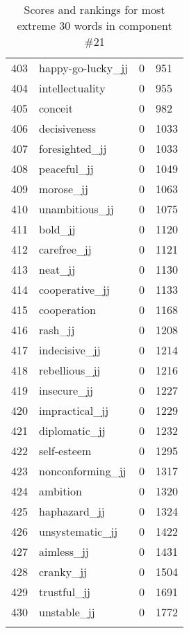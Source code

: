 \begin{longtable}[!htbp]{| rlr@{.}l |}
    403 & happy-go-lucky\_jj & 0 & 951 \\
    404 & intellectuality & 0 & 955 \\
    405 & conceit & 0 & 982 \\
    406 & decisiveness & 0 & 1033 \\
    407 & foresighted\_jj & 0 & 1033 \\
    408 & peaceful\_jj & 0 & 1049 \\
    409 & morose\_jj & 0 & 1063 \\
    410 & unambitious\_jj & 0 & 1075 \\
    411 & bold\_jj & 0 & 1120 \\
    412 & carefree\_jj & 0 & 1121 \\
    413 & neat\_jj & 0 & 1130 \\
    414 & cooperative\_jj & 0 & 1133 \\
    415 & cooperation & 0 & 1168 \\
    416 & rash\_jj & 0 & 1208 \\
    417 & indecisive\_jj & 0 & 1214 \\
    418 & rebellious\_jj & 0 & 1216 \\
    419 & insecure\_jj & 0 & 1227 \\
    420 & impractical\_jj & 0 & 1229 \\
    421 & diplomatic\_jj & 0 & 1232 \\
    422 & self-esteem & 0 & 1295 \\
    423 & nonconforming\_jj & 0 & 1317 \\
    424 & ambition & 0 & 1320 \\
    425 & haphazard\_jj & 0 & 1324 \\
    426 & unsystematic\_jj & 0 & 1422 \\
    427 & aimless\_jj & 0 & 1431 \\
    428 & cranky\_jj & 0 & 1504 \\
    429 & trustful\_jj & 0 & 1691 \\
    430 & unstable\_jj & 0 & 1772 \\
    \hline
    \caption{Scores and rankings for most extreme 30 words in component \#21} \\
\end{longtable}

